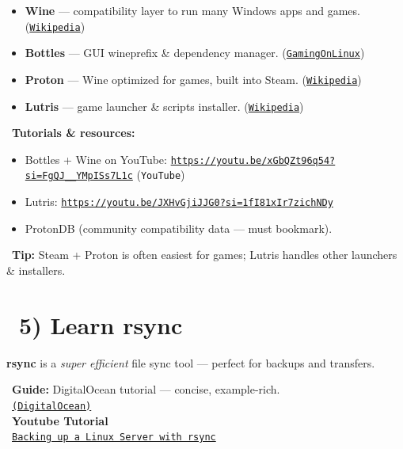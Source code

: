 \documentclass[12pt]{article}
\newcommand{\bookicon}{\faBook}
\newcommand{\videoicon}{\faVideo}
\newcommand{\syncicon}{\faSync}
\begin{document}
\begin{itemize}
    \item \textbf{Wine} — compatibility layer to run many Windows apps and games. (\href{https://en.wikipedia.org/wiki/Wine_\%28software\%29}{\texttt{Wikipedia}})
    \item \textbf{Bottles} — GUI wineprefix \& dependency manager. (\href{https://www.gamingonlinux.com/2021/12/use-wine-for-gaming-on-linux-try-out-bottles/page\%3D2/}{\texttt{GamingOnLinux}})
    \item \textbf{Proton} — Wine optimized for games, built into Steam. (\href{https://en.wikipedia.org/wiki/Proton_\%28software\%29}{\texttt{Wikipedia}})
    \item \textbf{Lutris} — game launcher \& scripts installer. (\href{https://en.wikipedia.org/wiki/Lutris}{\texttt{Wikipedia}})
\end{itemize}

\begin{infobox}
\bookicon\ \textbf{Tutorials \& resources:}
\begin{itemize}
    \item Bottles + Wine on YouTube: \href{https://youtu.be/xGbQZt96q54?si=FgQJ__YMpISs7L1c}{\texttt{https://youtu.be/xGbQZt96q54?si=FgQJ\_\_YMpISs7L1c}} (\texttt{YouTube})
    \item Lutris: \href{https://youtu.be/JXHvGjiJJG0?si=1fI81xIr7zichNDy}{\texttt{https://youtu.be/JXHvGjiJJG0?si=1fI81xIr7zichNDy}}
    \item ProtonDB (community compatibility data — must bookmark).
\end{itemize}
\end{infobox}

\begin{infobox}
\faLightbulb\ \textbf{Tip:} Steam + Proton is often easiest for games; Lutris handles other launchers \& installers.
\end{infobox}

\section*{\syncicon\ 5) Learn \textbf{rsync}}

\textbf{rsync} is a \textit{super efficient} file sync tool — perfect for backups and transfers.

\begin{infobox}
\bookicon\ \textbf{Guide:} DigitalOcean tutorial — concise, example-rich.\\
\faArrowRight\ \href{https://www.digitalocean.com/community/tutorials/how-to-use-rsync-to-sync-local-and-remote-directories}{\texttt{(DigitalOcean)}}\\
\videoicon\ \textbf{Youtube Tutorial}\\
\faArrowRight\ \href{https://youtu.be/GqSxR93xK6E?si=c2TvpU8R-53SXDty}{\texttt{Backing up a Linux Server with rsync}}
\end{infobox}
\end{document}
